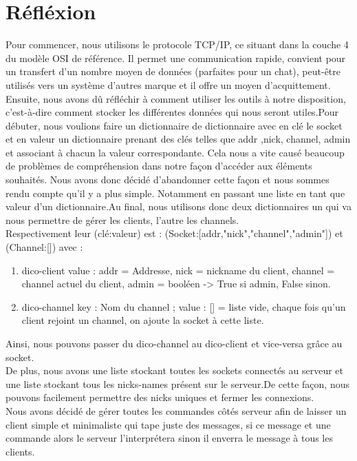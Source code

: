 \documentclass[12pt]{article}
\begin{document}
\section{Réfléxion}
Pour commencer, nous utilisons le protocole TCP/IP, ce situant dans la couche 4 du modèle OSI de référence. Il permet une communication rapide, convient pour un transfert d'un nombre moyen de données (parfaites pour un chat), peut-être utilisés vers un système d'autres marque et il offre un moyen d'acquittement. \\
Ensuite, nous avons dû réfléchir à comment utiliser les outils à notre disposition, c'est-à-dire comment stocker les différentes données qui nous seront utiles.Pour débuter, nous voulions faire un dictionnaire de dictionnaire avec en clé le socket et en valeur un dictionnaire prenant des clés telles que addr ,nick, channel, admin et associant à chacun la valeur correspondante.
Cela nous a vite causé beaucoup de problèmes de compréhension dans notre façon d'accéder aux éléments souhaités. Nous avons donc décidé d'abandonner cette façon et nous sommes rendu compte qu'il y a plus simple. 
Notamment en passant une liste en tant que valeur d'un dictionnaire.Au final, nous utilisons donc deux dictionnaires un qui va nous permettre de gérer les clients, l'autre les channels.\\
Respectivement leur (clé:valeur) est : (Socket:[addr,"nick","channel","admin"]) et (Channel:[]) avec :
\begin{enumerate}
    \item dico-client value : addr = Addresse, nick = nickname du client, channel  = channel actuel du client, admin = booléen -> True si admin, False sinon.
    \item dico-channel key : Nom du channel ; value : [] = liste vide, chaque fois qu'un client rejoint un channel, on ajoute la socket à cette liste.
\end{enumerate}
Ainsi, nous pouvons passer du dico-channel au dico-client et vice-versa grâce au socket.\\De plus, nous avons une liste stockant toutes les sockets connectés au serveur et une liste stockant tous les nicks-names présent sur le serveur.De cette façon, nous pouvons facilement permettre des nicks uniques et fermer les connexions.\\
Nous avons décidé de gérer toutes les commandes côtés serveur afin de laisser un client simple et minimaliste qui tape juste des messages, si ce message et une commande alors le serveur l'interprétera sinon il enverra le message à tous les clients.
\end{document}
